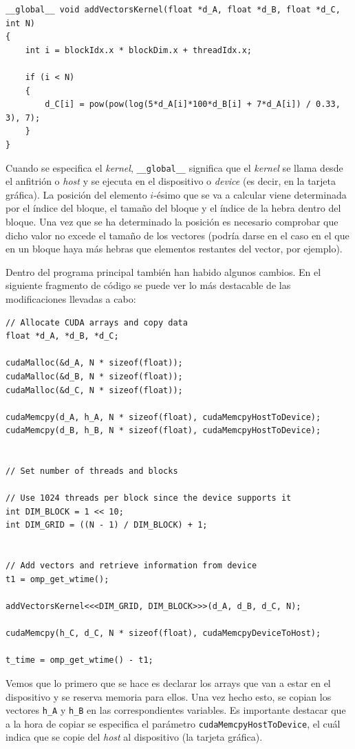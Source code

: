 \documentclass[11pt,a4paper]{article}
\begin{document}
\begin{lstlisting}
__global__ void addVectorsKernel(float *d_A, float *d_B, float *d_C, int N)
{
    int i = blockIdx.x * blockDim.x + threadIdx.x;

    if (i < N)
    {
        d_C[i] = pow(pow(log(5*d_A[i]*100*d_B[i] + 7*d_A[i]) / 0.33, 3), 7);
    }
}
\end{lstlisting}

Cuando se especifica el \textit{kernel}, \texttt{\_\_global\_\_} significa que
el \textit{kernel} se llama desde el anfitrión o \textit{host} y se ejecuta
en el dispositivo o \textit{device} (es decir, en la tarjeta gráfica). La posición del
elemento $i$-ésimo que se va a calcular viene determinada por el índice del bloque,
el tamaño del bloque y el índice de la hebra dentro del bloque. Una vez que se
ha determinado la posición es necesario comprobar que dicho valor no excede el
tamaño de los vectores (podría darse en el caso en el que en un bloque haya más
hebras que elementos restantes del vector, por ejemplo).

Dentro del programa principal también han habido algunos cambios. En el siguiente fragmento
de código se puede ver lo más destacable de las modificaciones llevadas a cabo:

\begin{lstlisting}
// Allocate CUDA arrays and copy data
float *d_A, *d_B, *d_C;

cudaMalloc(&d_A, N * sizeof(float));
cudaMalloc(&d_B, N * sizeof(float));
cudaMalloc(&d_C, N * sizeof(float));

cudaMemcpy(d_A, h_A, N * sizeof(float), cudaMemcpyHostToDevice);
cudaMemcpy(d_B, h_B, N * sizeof(float), cudaMemcpyHostToDevice);


// Set number of threads and blocks

// Use 1024 threads per block since the device supports it
int DIM_BLOCK = 1 << 10;
int DIM_GRID = ((N - 1) / DIM_BLOCK) + 1;

    
// Add vectors and retrieve information from device
t1 = omp_get_wtime();

addVectorsKernel<<<DIM_GRID, DIM_BLOCK>>>(d_A, d_B, d_C, N);

cudaMemcpy(h_C, d_C, N * sizeof(float), cudaMemcpyDeviceToHost);

t_time = omp_get_wtime() - t1;
\end{lstlisting}

Vemos que lo primero que se hace es declarar los arrays que van a estar en el dispositivo
y se reserva memoria para ellos. Una vez hecho esto, se copian los vectores \texttt{h\_A}
y \texttt{h\_B} en las correspondientes variables. Es importante destacar que a la hora
de copiar se especifica el parámetro \texttt{cudaMemcpyHostToDevice}, el cuál indica que
se copie del \textit{host} al dispositivo (la tarjeta gráfica).
\end{document}
